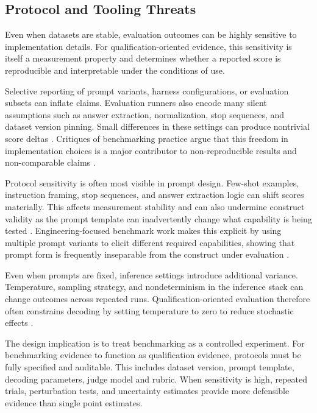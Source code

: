 
\subsection{Protocol and Tooling Threats}
\label{subsec:ch2_protocol_threats}

Even when datasets are stable, evaluation outcomes can be highly sensitive to implementation details. For qualification-oriented evidence, this sensitivity is itself a measurement property and determines whether a reported score is reproducible and interpretable under the conditions of use.

Selective reporting of prompt variants, harness configurations, or evaluation subsets can inflate claims. Evaluation runners also encode many silent assumptions such as answer extraction, normalization, stop sequences, and dataset version pinning. Small differences in these settings can produce nontrivial score deltas \cite{liang_HolisticEvaluationLanguage_2023, laskarSystematicSurveyCritical2024}. Critiques of benchmarking practice argue that this freedom in implementation choices is a major contributor to non-reproducible results and non-comparable claims \cite{mcintoshInadequaciesLargeLanguage2024}. 

Protocol sensitivity is often most visible in prompt design. Few-shot examples, instruction framing, stop sequences, and answer extraction logic can shift scores materially. This affects measurement stability and can also undermine construct validity as the prompt template can inadvertently change what capability is being tested \cite{gao_FrameworkFewshotLanguage_2024}. Engineering-focused benchmark work makes this explicit by using multiple prompt variants to elicit different required capabilities, showing that prompt form is frequently inseparable from the construct under evaluation \cite{zhouEngiBenchBenchmarkEvaluating2025}. 

Even when prompts are fixed, inference settings introduce additional variance. Temperature, sampling strategy, and nondeterminism in the inference stack can change outcomes across repeated runs. Qualification-oriented evaluation therefore often constrains decoding by setting temperature to zero to reduce stochastic effects \cite{gao_LanguageModelEvaluation_2024, gao_FrameworkFewshotLanguage_2024}.

The design implication is to treat benchmarking as a controlled experiment. For benchmarking evidence to function as qualification evidence, protocols must be fully specified and auditable. This includes dataset version, prompt template, decoding parameters, judge model and rubric. When sensitivity is high, repeated trials, perturbation tests, and uncertainty estimates provide more defensible evidence than single point estimates.


